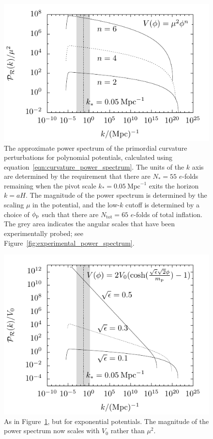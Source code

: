 \begin{figure}[tp]
  \includegraphics[width=\textwidth]{chapters/kinetic_dominance/figures/CSpol}
  \caption{The approximate power spectrum of the primordial curvature perturbations for polynomial potentials, calculated using equation~\protect\eqref{eqn:curvature_power_spectrum}. The units of the \(k\) axis are determined by the requirement that there are \(N_*=55\) \(e\)-folds remaining when the pivot scale \(k_*=0.05\:\mathrm{Mpc}^{-1}\) exits the horizon \(k=aH\). The magnitude of the power spectrum is determined by the scaling \(\mu\) in the potential, and the low-\(k\) cutoff is determined by a choice of \(\phi_{\mathrm{p}}\) such that there are \(N_\mathrm{tot}=65\) \(e\)-folds of total inflation. The grey area indicates the angular scales that have been experimentally probed; see Figure~\protect\ref{fig:experimental_power_spectrum}.}\label{fig:figure_CSpol}
\end{figure}

\begin{figure}[tp]
  \includegraphics[width=\textwidth]{chapters/kinetic_dominance/figures/CSlam}
  \caption{As in Figure~\protect\ref{fig:figure_CSpol}, but for exponential potentials. The magnitude of the power spectrum now scales with \(V_0\) rather than \(\mu^2\).}\label{fig:figure_CSlam}
\end{figure}



